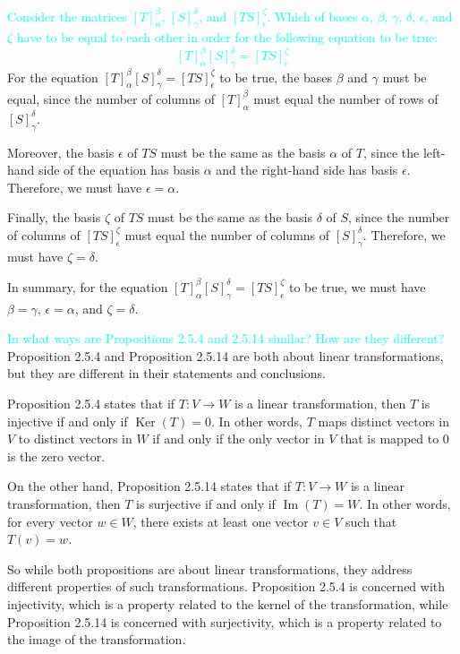 \documentclass[fontsize=12pt]{scrartcl}
\begin{document}
\newpage

\noindent
\textcolor{cyan}{Consider the matrices $[T]_{\alpha}^{\beta}$,  $[S]_{\gamma}^{\delta}$, and $[TS]_{\epsilon}^{\zeta}$. Which of bases $\alpha$, $\beta$, $\gamma$, $\delta$, $\epsilon$, and $\zeta$ have to be equal to each other in order for the following equation to be true: $$[T]_{\alpha}^{\beta} [S]_{\gamma}^{\delta} = [TS]_{\epsilon}^{\zeta}$$}
\noindent
For the equation $[T]_{\alpha}^{\beta} [S]_{\gamma}^{\delta} = [TS]_{\epsilon}^{\zeta}$ to be true, the bases $\beta$ and $\gamma$ must be equal, since the number of columns of $[T]_{\alpha}^{\beta}$ must equal the number of rows of $[S]_{\gamma}^{\delta}$.

\noindent
Moreover, the basis $\epsilon$ of $TS$ must be the same as the basis $\alpha$ of $T$, since the left-hand side of the equation has basis $\alpha$ and the right-hand side has basis $\epsilon$. Therefore, we must have $\epsilon = \alpha$.

\noindent
Finally, the basis $\zeta$ of $TS$ must be the same as the basis $\delta$ of $S$, since the number of columns of $[TS]_{\epsilon}^{\zeta}$ must equal the number of columns of $[S]_{\gamma}^{\delta}$. Therefore, we must have $\zeta = \delta$.

\noindent
In summary, for the equation $[T]_{\alpha}^{\beta} [S]_{\gamma}^{\delta} = [TS]_{\epsilon}^{\zeta}$ to be true, we must have $\beta = \gamma$, $\epsilon = \alpha$, and $\zeta = \delta$.

\noindent
\textcolor{cyan}{In what ways are Propositions 2.5.4 and 2.5.14 similar? How are they different?}
\noindent
Proposition 2.5.4 and Proposition 2.5.14 are both about linear transformations, but they are different in their statements and conclusions.

\noindent
Proposition 2.5.4 states that if $T: V \to W$ is a linear transformation, then $T$ is injective if and only if $\operatorname{Ker}(T) = {0}$. In other words, $T$ maps distinct vectors in $V$ to distinct vectors in $W$ if and only if the only vector in $V$ that is mapped to $0$ is the zero vector.

\noindent
On the other hand, Proposition 2.5.14 states that if $T: V \to W$ is a linear transformation, then $T$ is surjective if and only if $\operatorname{Im}(T) = W$. In other words, for every vector $w \in W$, there exists at least one vector $v \in V$ such that $T(v) = w$.

\noindent
So while both propositions are about linear transformations, they address different properties of such transformations. Proposition 2.5.4 is concerned with injectivity, which is a property related to the kernel of the transformation, while Proposition 2.5.14 is concerned with surjectivity, which is a property related to the image of the transformation.
\end{document}
